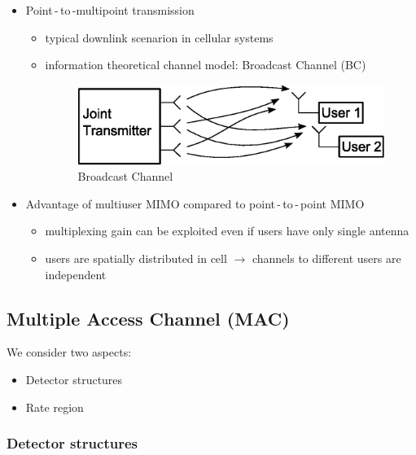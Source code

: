 \documentclass[a4paper, 10pt]{article}
\begin{document}
\begin{itemize}
\begin{itemize}
	\end{itemize}
	\item Point\,-\,to\,-multipoint transmission
	\begin{itemize}
		\item typical downlink scenarion in cellular systems
		\item information theoretical channel model: Broadcast Channel (BC)
		\begin{figure}[h]
			\centering
			\includegraphics[scale=0.8]{BC}
			\caption{Broadcast Channel}		
			\label{fig:BC}
		\end{figure}	
	\end{itemize}
	\item Advantage of multiuser MIMO compared to point\,-\,to\,-\,point MIMO
	\begin{itemize}
		\item multiplexing gain can be exploited even if users have only single antenna
		\item users are spatially distributed in cell $\rightarrow $ channels to different users are independent
	\end{itemize}
\end{itemize}

\subsection{Multiple Access Channel (MAC)}
We consider two aspects:
\begin{itemize}
	\item Detector structures
	\item Rate region
\end{itemize}
\subsubsection{Detector structures}
\end{document}
